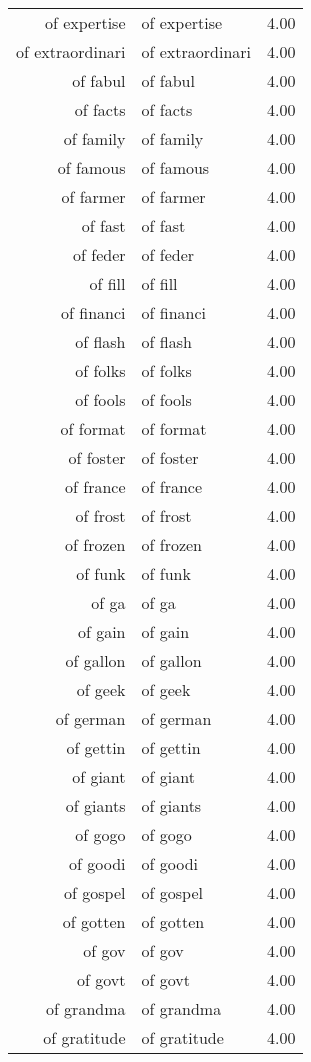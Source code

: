 \begin{table}[ht]
\begin{tabular}{rlr}
  of expertise & of expertise & 4.00 \\ 
  of extraordinari & of extraordinari & 4.00 \\ 
  of fabul & of fabul & 4.00 \\ 
  of facts & of facts & 4.00 \\ 
  of family & of family & 4.00 \\ 
  of famous & of famous & 4.00 \\ 
  of farmer & of farmer & 4.00 \\ 
  of fast & of fast & 4.00 \\ 
  of feder & of feder & 4.00 \\ 
  of fill & of fill & 4.00 \\ 
  of financi & of financi & 4.00 \\ 
  of flash & of flash & 4.00 \\ 
  of folks & of folks & 4.00 \\ 
  of fools & of fools & 4.00 \\ 
  of format & of format & 4.00 \\ 
  of foster & of foster & 4.00 \\ 
  of france & of france & 4.00 \\ 
  of frost & of frost & 4.00 \\ 
  of frozen & of frozen & 4.00 \\ 
  of funk & of funk & 4.00 \\ 
  of ga & of ga & 4.00 \\ 
  of gain & of gain & 4.00 \\ 
  of gallon & of gallon & 4.00 \\ 
  of geek & of geek & 4.00 \\ 
  of german & of german & 4.00 \\ 
  of gettin & of gettin & 4.00 \\ 
  of giant & of giant & 4.00 \\ 
  of giants & of giants & 4.00 \\ 
  of gogo & of gogo & 4.00 \\ 
  of goodi & of goodi & 4.00 \\ 
  of gospel & of gospel & 4.00 \\ 
  of gotten & of gotten & 4.00 \\ 
  of gov & of gov & 4.00 \\ 
  of govt & of govt & 4.00 \\ 
  of grandma & of grandma & 4.00 \\ 
  of gratitude & of gratitude & 4.00 \\ 

\end{tabular}
\end{table}
